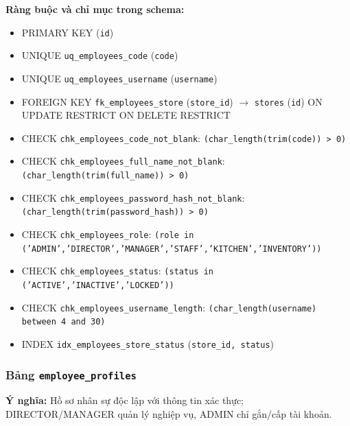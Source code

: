 \textbf{Ràng buộc và chỉ mục trong schema:}

\begin{itemize}

\item PRIMARY KEY (\texttt{id})

\item UNIQUE \texttt{uq\_employees\_code} (\texttt{code})

\item UNIQUE \texttt{uq\_employees\_username} (\texttt{username})

\item FOREIGN KEY \texttt{fk\_employees\_store} (\texttt{store\_id}) $\rightarrow$ \texttt{stores} (\texttt{id}) ON UPDATE RESTRICT ON DELETE RESTRICT

\item CHECK \texttt{chk\_employees\_code\_not\_blank}: \texttt{(char\_length(trim(code)) > 0)}

\item CHECK \texttt{chk\_employees\_full\_name\_not\_blank}: \texttt{(char\_length(trim(full\_name)) > 0)}

\item CHECK \texttt{chk\_employees\_password\_hash\_not\_blank}: \texttt{(char\_length(trim(password\_hash)) > 0)}

\item CHECK \texttt{chk\_employees\_role}: \texttt{(role in ('ADMIN','DIRECTOR','MANAGER','STAFF','KITCHEN','INVENTORY'))}

\item CHECK \texttt{chk\_employees\_status}: \texttt{(status in ('ACTIVE','INACTIVE','LOCKED'))}

\item CHECK \texttt{chk\_employees\_username\_length}: \texttt{(char\_length(username) between 4 and 30)}

\item INDEX \texttt{idx\_employees\_store\_status} (\texttt{store\_id, status})

\end{itemize}

\subsubsection{Bảng \texttt{employee\_profiles}}

\textbf{Ý nghĩa:} Hồ sơ nhân sự độc lập với thông tin xác thực; DIRECTOR/MANAGER quản lý nghiệp vụ, ADMIN chỉ gắn/cấp tài khoản.\par

